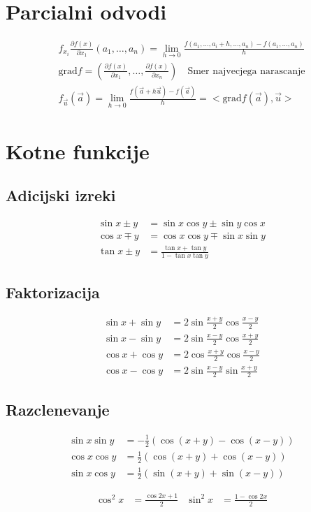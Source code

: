 \documentclass[a4paper,oneside,8pt]{extarticle}
\theoremstyle{definition}
\newcommand{\dpar}[2]{\ensuremath{\frac{\partial #1}{\partial #2}}}
\newcommand\okr[1]{\left(#1\right)}
\begin{document}
\begin{multicols}{2}
	\section*{Parcialni odvodi}
	\begin{align*}
		f_{x_i}\dpar{f(x)}{x_1} (a_1, \dots ,a_n) = \lim_{h \to 0} \frac{f(a_1,\dots,a_i + h, \dots , a_n) - f(a_1,\dots,a_n)}{h}\\
		\text{grad} f = \okr{\dpar{f(x)}{x_1}, \dots, \dpar{f(x)}{x_n}} \quad \text{Smer najvecjega narascanje}\\
		f_{\vec{u}}(\vec{a}) = \lim_{h \to 0} \frac{f(\vec{a} + h\vec{u}) - f(\vec{a})}{h} = <\text{grad} f(\vec{a}), \vec{u}>
	\end{align*}	
%
	\section*{Kotne funkcije}
	\subsection*{Adicijski izreki}
	\begin{align*}
		\sin{x \pm y} &= \sin{x}\cos{y} \pm \sin{y}\cos{x}\\
		\cos{x \mp y} &= \cos{x}\cos{y} \mp \sin{x}\sin{y}\\
		\tan{x \pm y} &= \frac{\tan{x} + \tan{y}}{1 - \tan{x}\tan{y}}
	\end{align*}
	\subsection*{Faktorizacija}
	\begin{align*}
		\sin{x} + \sin{y} &= 2\sin{\frac{x+y}{2}} \cos{\frac{x-y}{2}}\\
		\sin{x} - \sin{y} &= 2\sin{\frac{x-y}{2}} \cos{\frac{x+y}{2}}\\
		\cos{x} + \cos{y} &= 2\cos{\frac{x+y}{2}} \cos{\frac{x-y}{2}}\\
		\cos{x} - \cos{y} &= 2\sin{\frac{x-y}{2}} \sin{\frac{x+y}{2}}
	\end{align*}
	\subsection*{Razclenevanje}
	\begin{align*}
		\sin{x}\sin{y} &= -\frac{1}{2}\left(\cos{(x+y)} - \cos{(x-y)} \right)\\
		\cos{x}\cos{y} &= \frac{1}{2}\left(\cos{(x+y)} + \cos{(x-y)} \right)\\
		\sin{x}\cos{y} &= \frac{1}{2}\left(\sin{(x+y)} + \sin{(x-y)} \right)
	\end{align*}

	\begin{align*}
		\cos^2{x} &= \frac{\cos{2x} + 1}{2} & \sin^2{x} &= \frac{1 - \cos{2x}}{2}
	\end{align*}	


\end{multicols}
\end{document}
